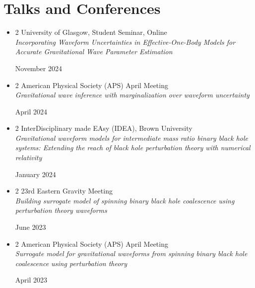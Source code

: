 \documentclass[10pt, letterpaper]{article}
\newenvironment{highlightsforbulletentries}{
    \begin{itemize}[
        topsep=0.10 cm,
        parsep=0.10 cm,
        partopsep=0pt,
        itemsep=0pt,
        leftmargin=10pt
    ]
}{
    \end{itemize}
}
\newenvironment{twocolentry}[2][]{
    \onecolentry
    \def\secondColumn{#2}
    \setcolumnwidth{\fill, 3.5 cm}
    \begin{paracol}{2}
}{
    \switchcolumn \raggedleft \secondColumn
    \end{paracol}
    \endonecolentry
}
\begin{document}
\section{Talks and Conferences}    
\begin{highlightsforbulletentries}
    \item \begin{twocolentry}
        {November 2024}{University of Glasgow, Student Seminar, Online}
        \\\textit{Incorporating Waveform Uncertainties in Effective-One-Body Models for Accurate Gravitational Wave Parameter Estimation}
    \end{twocolentry}

    \item 
    \begin{twocolentry}{April 2024}{American Physical Society (APS) April Meeting}
        \\\textit{Gravitational wave inference with marginalization over waveform uncertainty}
    \end{twocolentry}

    \item \begin{twocolentry}
        {January 2024}{InterDisciplinary made EAsy (IDEA), Brown University}
        \\\textit{Gravitational waveform models for intermediate mass ratio binary black hole systems: Extending the reach of black hole perturbation theory with numerical relativity}
    \end{twocolentry}

    \item 
    \begin{twocolentry}{June 2023}{23rd Eastern Gravity Meeting}
        \\\textit{Building surrogate model of spinning binary black hole coalescence using perturbation theory waveforms}
    \end{twocolentry}

    \item 
    \begin{twocolentry}{April 2023}{American Physical Society (APS) April Meeting}
      \\\textit{Surrogate model for gravitational waveforms from spinning binary black hole coalescence using perturbation theory}
    \end{twocolentry}
\end{highlightsforbulletentries}
\end{document}
